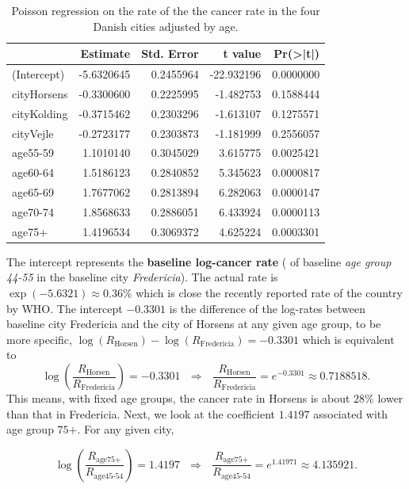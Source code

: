 \documentclass[
]{book}
\begin{document}
\begin{table}

\caption{\label{tab:unnamed-chunk-158}Poisson regression on the rate of the  the cancer rate in the four Danish cities adjusted by age.}
\centering
\begin{tabular}[t]{l|r|r|r|r}
\hline
  & Estimate & Std. Error & t value & Pr(>|t|)\\
\hline
(Intercept) & -5.6320645 & 0.2455964 & -22.932196 & 0.0000000\\
\hline
cityHorsens & -0.3300600 & 0.2225995 & -1.482753 & 0.1588444\\
\hline
cityKolding & -0.3715462 & 0.2303296 & -1.613107 & 0.1275571\\
\hline
cityVejle & -0.2723177 & 0.2303873 & -1.181999 & 0.2556057\\
\hline
age55-59 & 1.1010140 & 0.3045029 & 3.615775 & 0.0025421\\
\hline
age60-64 & 1.5186123 & 0.2840852 & 5.345623 & 0.0000817\\
\hline
age65-69 & 1.7677062 & 0.2813894 & 6.282063 & 0.0000147\\
\hline
age70-74 & 1.8568633 & 0.2886051 & 6.433924 & 0.0000113\\
\hline
age75+ & 1.4196534 & 0.3069372 & 4.625224 & 0.0003301\\
\hline
\end{tabular}
\end{table}

The intercept represents the \textbf{baseline log-cancer rate} ( of baseline \emph{age group 44-55} in the baseline city \emph{Fredericia}). The actual rate is \(\exp(-5.6321) \approx 0.36\%\) which is close the recently reported rate of the country by WHO. The intercept \(-0.3301\) is the difference of the log-rates between baseline city Fredericia and the city of Horsens at any given age group, to be more specific, \(\log(R_{\text{Horsen}}) - \log(R_{\text{Fredericia}}) = -0.3301\) which is equivalent to
\[
\log \left( \frac{R_{\text{Horsen}}}{R_{\text{Fredericia}}} \right) = -0.3301 ~~~\Rightarrow~~~\frac{R_{\text{Horsen}}}{R_{\text{Fredericia}}} = e^{-0.3301} \approx 0.7188518.
\]
This means, with fixed age groups, the cancer rate in Horsens is about \(28\%\) lower than that in Fredericia. Next, we look at the coefficient \(1.4197\) associated with age group \(\text{75+}\). For any given city,

\[
\log \left(\frac{R_{\text{age75+}}}{R_{\text{age45-54}}} \right) = 1.4197~~~\Rightarrow~~~\frac{R_{\text{age75+}}}{R_{\text{age45-54}}} = e^{1.41971} \approx 4.135921. 
\]
\end{document}
